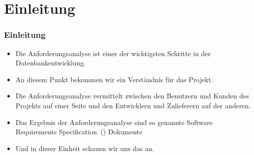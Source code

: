 \documentclass[aspectratio=169,mathserif,notheorems]{beamer}%
\subtitle{25.~Anforderungen}%
\begin{document}
%
%
\startPresentation%
%
\section{Einleitung}%
%
\begin{frame}%
\frametitle{Einleitung}%
\begin{itemize}%
\item Die Anforderungsanalyse ist einer der wichtigsten Schritte in der Datenbankentwicklung.%
%
\item<2-> An diesem Punkt bekommen wir ein Verständnis für das Projekt.%
%
\item<3-> Die Anforderungsanalyse vermittelt zwischen den Benutzern und Kunden des Projekts auf einer Seite und den Entwicklern und Zulieferern auf der anderen\cite{ISOIECIEEE2018SASELCPRE}.%
%
\item<4-> Das Ergebnis der Anforderungsanalyse sind so genannte Software Requirements Specification~() Dokumente\cite{ISOIECIEEE2018SASELCPRE}%
\item<9-> Und in dieser Einheit schauen wir uns das an.%
\end{itemize}%
\end{frame}%
%
\end{document}
